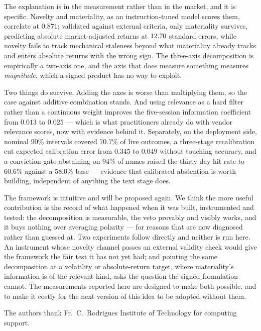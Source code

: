 The explanation is in the measurement rather than in the market, and it is
specific. Novelty and materiality, as an instruction-tuned model scores them,
correlate at $0.871$; validated against external criteria, only materiality
survives, predicting absolute market-adjusted returns at $12.70$ standard
errors, while novelty fails to track mechanical staleness beyond what materiality
already tracks and enters absolute returns with the wrong sign. The three-axis
decomposition is empirically a two-axis one, and the axis that does measure
something measures \emph{magnitude}, which a signed product has no way to exploit.

Two things do survive. Adding the axes is worse than multiplying them, so the
case against additive combination stands. And using relevance as a hard filter
rather than a continuous weight improves the five-session information coefficient
from $0.013$ to $0.025$ --- which is what practitioners already do with vendor
relevance scores, now with evidence behind it. Separately, on the deployment side,
nominal $90\%$ intervals covered $70.7\%$ of live outcomes, a three-stage
recalibration cut expected calibration error from $0.345$ to $0.049$ without
touching accuracy, and a conviction gate abstaining on $94\%$ of names raised the
thirty-day hit rate to $60.6\%$ against a $58.0\%$ base --- evidence that
calibrated abstention is worth building, independent of anything the text stage
does.

The framework is intuitive and will be proposed again. We think the more useful
contribution is the record of what happened when it was built, instrumented and
tested: the decomposition is measurable, the veto provably and visibly works, and
it buys nothing over averaging polarity --- for reasons that are now diagnosed
rather than guessed at. Two experiments follow directly and neither is run here.
An instrument whose novelty channel passes an external validity check would give
the framework the fair test it has not yet had; and pointing the same
decomposition at a volatility or absolute-return target, where materiality's
information is of the relevant kind, asks the question the signed formulation
cannot. The measurements reported here are designed to make both possible, and to
make it costly for the next version of this idea to be adopted without them.

\backmatter

The authors thank Fr.\ C.\ Rodrigues Institute of Technology for computing
support.

